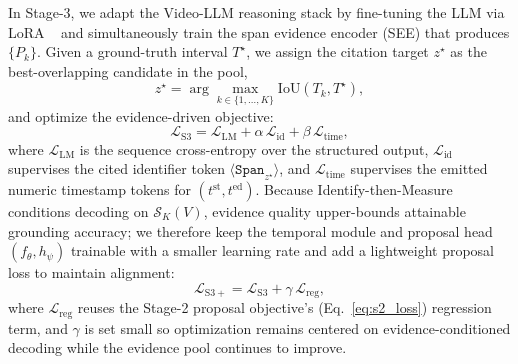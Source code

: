 \documentclass{article}
\theoremstyle{plain}
\theoremstyle{definition}
\theoremstyle{remark}
\begin{document}
In Stage-3, we adapt the Video-LLM reasoning stack by fine-tuning the LLM via LoRA ~\cite{LoRA} and simultaneously train the span evidence encoder (SEE) that produces $\{P_k\}$.
Given a ground-truth interval $T^\star$, we assign the citation target $z^\star$ as the best-overlapping candidate in the pool,
\begin{equation}
z^\star=\arg\max_{k\in\{1,\ldots,K\}}\mathrm{IoU}(T_k,T^\star),
\end{equation}
and optimize the evidence-driven objective:
\begin{equation}
\mathcal{L}_{\mathrm{S3}}
=
\mathcal{L}_{\mathrm{LM}}
+
\alpha\,\mathcal{L}_{\mathrm{id}}
+
\beta\,\mathcal{L}_{\mathrm{time}},
\label{eq:s3_reason}
\end{equation}
where $\mathcal{L}_{\mathrm{LM}}$ is the sequence cross-entropy over the structured output,
$\mathcal{L}_{\mathrm{id}}$ supervises the cited identifier token $\langle\texttt{Span}_{z^\star}\rangle$,
and $\mathcal{L}_{\mathrm{time}}$ supervises the emitted numeric timestamp tokens for $(t^{\mathrm{st}},t^{\mathrm{ed}})$.
Because Identify-then-Measure conditions decoding on $\mathcal{S}_K(V)$, evidence quality upper-bounds attainable grounding accuracy; we therefore keep the temporal module and proposal head $(f_\theta,h_\psi)$ trainable with a smaller learning rate and add a lightweight proposal loss to maintain alignment:
\begin{equation}
\mathcal{L}_{\mathrm{S3+}}
=
\mathcal{L}_{\mathrm{S3}}
+
\gamma\,\mathcal{L}_{\mathrm{reg}},
\label{eq:s3_plus}
\end{equation}
where $\mathcal{L}_{\mathrm{reg}}$ reuses the Stage-2 proposal objective's (Eq.~\ref{eq:s2_loss}) regression term, and $\gamma$ is set small so optimization remains centered on evidence-conditioned decoding while the evidence pool continues to improve.
\end{document}
